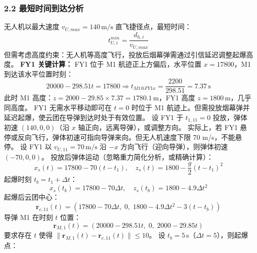 \documentclass{JXUSTmodeling}
\begin{document}
\subsubsection{2.2 最短时间到达分析}
无人机以最大速度 $v_{U,max}=140\,\mathrm{m/s}$ 直飞捷径点，最短时间：
\begin{equation}
t_{U,i}^{min}=\frac{d_{h,i}}{v_{U,max}} \tag{2.2}
\end{equation}
但需考虑高度约束：无人机等高度飞行，投放后烟幕弹需通过引信延迟调整起爆高度。
\textbf{FY1 关键计算：}
FY1 位于 M1 航迹正上方偏后，水平位置 $x=17800$，M1 到达该水平位置时刻：
\begin{equation}
20000-298.51t=17800\Rightarrow t_{M1@FY1x}=\frac{2200}{298.51}=7.37\,\mathrm{s} \tag{2.3}
\end{equation}
此时 M1 高度：$z=2000-29.85\times 7.37=1780.1\,\mathrm{m}$，FY1 高度 $z=1800\,\mathrm{m}$，几乎同高度。
FY1 无需水平移动即可在 $t=0$ 时位于 M1 航迹上。但需投放烟幕弹并延迟起爆，使云团在导弹到达时处于有效位置。
设 FY1 于 $t_{1,11}=0$ 投放，弹体初速 $(140,0,0)$（沿 $x$ 轴正向，远离导弹），或调整方向。
实际上，若 FY1 悬停或反向飞行，弹体初速可指向导弹来向。但无人机速度下限 70 m/s，不能悬停。
设 FY1 以 $v_{U,11}=70\,\mathrm{m/s}$ 沿 $-x$ 方向飞行（迎向导弹），则弹体初速 $(-70,0,0)$。
投放后弹体运动（忽略重力简化分析，或精确计算）：
\begin{equation}
x_s(t)=17800-70(t-t_1),\quad z_s(t)=1800-\frac{g}{2}(t-t_1)^2 \tag{2.4}
\end{equation}
起爆时刻 $t_b=t_1+\Delta t$：
\begin{equation}
x_s(t_b)=17800-70\Delta t,\quad z_s(t_b)=1800-4.9\Delta t^2 \tag{2.5}
\end{equation}
起爆后云团中心：
\begin{equation}
\mathbf{r}_{c,11}(t)=(17800-70\Delta t,\;0,\;1800-4.9\Delta t^2-3(t-t_b)) \tag{2.6}
\end{equation}
导弹 M1 在时刻 $t$ 位置：
\begin{equation}
\mathbf{r}_{M,1}(t)=(20000-298.51t,\;0,\;2000-29.85t) \tag{2.7}
\end{equation}
要求存在 $t$ 使得 $\|\mathbf{r}_{M,1}(t)-\mathbf{r}_{c,11}(t)\|\leq 10$。
设 $t_b=5\,\mathrm{s}$（$\Delta t=5$），则起爆点：
\end{document}
